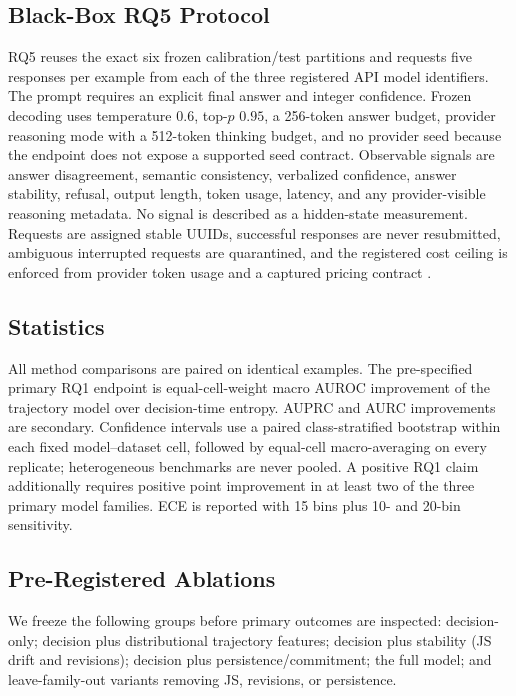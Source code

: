 \documentclass[10pt]{article}
\begin{document}
\subsection{Black-Box RQ5 Protocol}

RQ5 reuses the exact six frozen calibration/test partitions and requests five
responses per example from each of the three registered API model identifiers.
The prompt requires an explicit final answer and integer confidence. Frozen
decoding uses temperature $0.6$, top-$p$ $0.95$, a 256-token answer budget,
provider reasoning mode with a 512-token thinking budget, and no provider seed
because the endpoint does not expose a supported seed contract. Observable
signals are answer disagreement, semantic consistency, verbalized confidence,
answer stability, refusal, output length, token usage, latency, and any
provider-visible reasoning metadata. No signal is described as a hidden-state
measurement. Requests are assigned stable UUIDs, successful responses are
never resubmitted, ambiguous interrupted requests are quarantined, and the
registered cost ceiling is enforced from provider token usage and a captured
pricing contract \citep{siliconflowpricing}.

\subsection{Statistics}

All method comparisons are paired on identical examples.
The pre-specified primary RQ1 endpoint is equal-cell-weight macro AUROC improvement of the trajectory model over decision-time entropy.
AUPRC and AURC improvements are secondary.
Confidence intervals use a paired class-stratified bootstrap within each fixed model--dataset cell, followed by equal-cell macro-averaging on every replicate; heterogeneous benchmarks are never pooled.
A positive RQ1 claim additionally requires positive point improvement in at least two of the three primary model families.
ECE is reported with 15 bins plus 10- and 20-bin sensitivity.

\subsection{Pre-Registered Ablations}

We freeze the following groups before primary outcomes are inspected:
decision-only; decision plus distributional trajectory features; decision plus stability (JS drift and revisions); decision plus persistence/commitment; the full model; and leave-family-out variants removing JS, revisions, or persistence.
\end{document}
